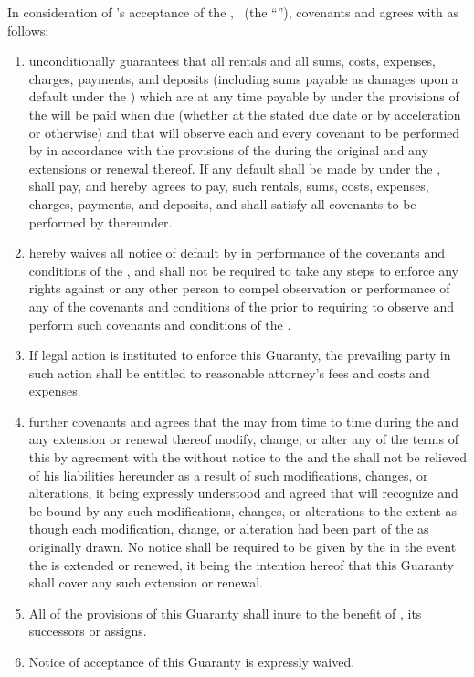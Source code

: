 \noindent In consideration of \lessor's acceptance of the \lease, \guarantorName\ (the ``\guarantor''), covenants and agrees with \lessor as follows:

\begin{enumerate}
\item \guarantor unconditionally guarantees that all rentals and all sums, costs, expenses, charges, payments, and deposits (including sums payable as damages upon a default under the \lease) which are at any time payable by \lessee under the provisions of the \lease will be paid when due (whether at the stated due date or by acceleration or otherwise) and that \lessee will observe each and every covenant to be performed by \lessee in accordance with the provisions of the \lease during the original \termOfLease and any extensions or renewal thereof. If any default shall be made by \lessee under the \lease, \guarantor shall pay, and hereby agrees to pay, \lessor such rentals, sums, costs, expenses, charges, payments, and deposits, and shall satisfy all covenants to be performed by \lessee thereunder.

\item \guarantor hereby waives all notice of default by \lessee in performance of the covenants and conditions of the \lease, and \lessor shall not be required to take any steps to enforce any rights against \lessee or any other person to compel observation or performance of any of the covenants and conditions of the \lease prior to requiring \guarantor to observe and perform such covenants and conditions of the \lease.

\item If legal action is instituted to enforce this Guaranty, the prevailing party in such action shall be entitled to reasonable attorney's fees and costs and expenses.

\item \guarantor further covenants and agrees that the \lessor may from time to time during the \termOfLease and any extension or renewal thereof modify, change, or alter any of the terms of this \lease by agreement with the \lessee without notice to the \guarantor and the \guarantor shall not be relieved of his liabilities hereunder as a result of such modifications, changes, or alterations, it being expressly understood and agreed that \guarantor will recognize and be bound by any such modifications, changes, or alterations to the extent as though each modification, change, or alteration had been part of the \lease as originally drawn. No notice shall be required to be given by the \lessor in the event the \lease is extended or renewed, it being the intention hereof that this Guaranty shall cover any such extension or renewal.

\item All of the provisions of this Guaranty shall inure to the benefit of \lessor, its successors or assigns.

\item Notice of acceptance of this Guaranty is expressly waived.
\end{enumerate}

